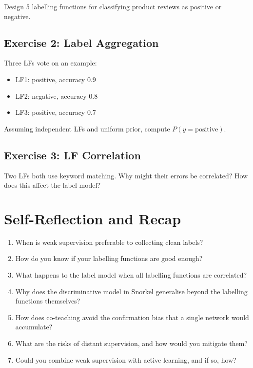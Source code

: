 Design 5 labelling functions for classifying product reviews as positive or negative.

\subsection{Exercise 2: Label Aggregation}

Three LFs vote on an example:
\begin{itemize}
    \item LF1: positive, accuracy 0.9
    \item LF2: negative, accuracy 0.8
    \item LF3: positive, accuracy 0.7
\end{itemize}

Assuming independent LFs and uniform prior, compute $P(y = \text{positive})$.

\subsection{Exercise 3: LF Correlation}

Two LFs both use keyword matching. Why might their errors be correlated? How does this affect the label model?


\section{Self-Reflection and Recap}


\begin{enumerate}
    \item When is weak supervision preferable to collecting clean labels?
    \item How do you know if your labelling functions are good enough?
    \item What happens to the label model when all labelling functions are correlated?
    \item Why does the discriminative model in Snorkel generalise beyond the labelling functions themselves?
    \item How does co-teaching avoid the confirmation bias that a single network would accumulate?
    \item What are the risks of distant supervision, and how would you mitigate them?
    \item Could you combine weak supervision with active learning, and if so, how?
\end{enumerate}

